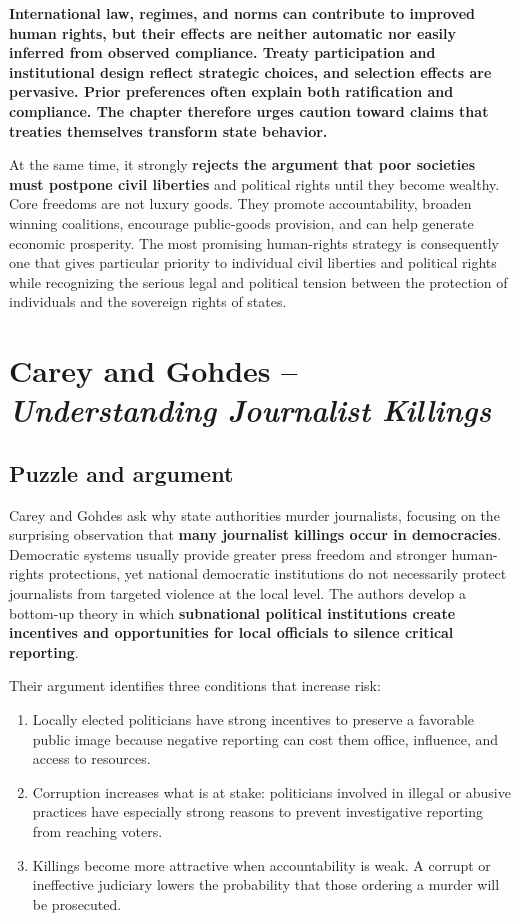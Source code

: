 \textbf{International law, regimes, and norms can contribute to improved human rights, but their effects are neither automatic nor easily inferred from observed compliance. Treaty participation and institutional design reflect strategic choices, and selection effects are pervasive. Prior preferences often explain both ratification and compliance. The chapter therefore urges caution toward claims that treaties themselves transform state behavior.}

At the same time, it strongly \textbf{rejects the argument that poor societies must postpone civil liberties} and political rights until they become wealthy. Core freedoms are not luxury goods. They promote accountability, broaden winning coalitions, encourage public-goods provision, and can help generate economic prosperity. The most promising human-rights strategy is consequently one that gives particular priority to individual civil liberties and political rights while recognizing the serious legal and political tension between the protection of individuals and the sovereign rights of states.

\clearpage
\section{Carey and Gohdes -- \textit{Understanding Journalist Killings}}

\subsection{Puzzle and argument}

Carey and Gohdes ask why state authorities murder journalists, focusing on the surprising observation that \textbf{many journalist killings occur in democracies}. Democratic systems usually provide greater press freedom and stronger human-rights protections, yet national democratic institutions do not necessarily protect journalists from targeted violence at the local level. The authors develop a bottom-up theory in which \textbf{subnational political institutions create incentives and opportunities for local officials to silence critical reporting}.

Their argument identifies three conditions that increase risk:
\begin{enumerate}
    \item Locally elected politicians have strong incentives to preserve a favorable public image because negative reporting can cost them office, influence, and access to resources.

    \item Corruption increases what is at stake: politicians involved in illegal or abusive practices have especially strong reasons to prevent investigative reporting from reaching voters.

    \item Killings become more attractive when accountability is weak. A corrupt or ineffective judiciary lowers the probability that those ordering a murder will be prosecuted.
\end{enumerate}

